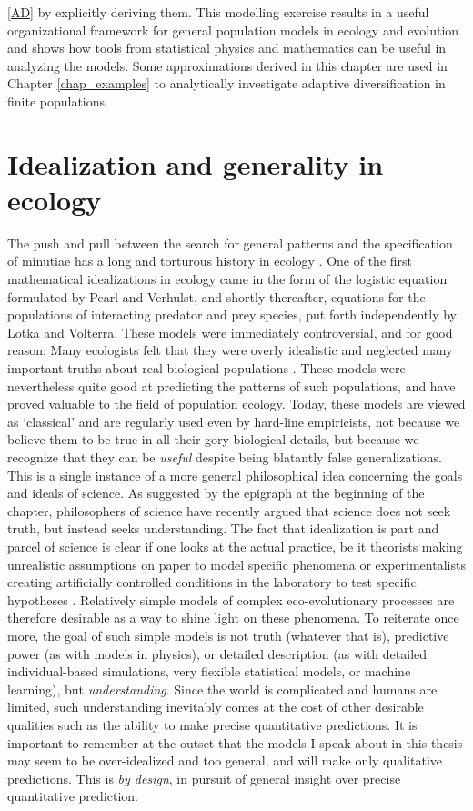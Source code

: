 \ref{AD} by explicitly deriving them. This modelling exercise results in a useful organizational framework for general population models in ecology and evolution and shows how tools from statistical physics and mathematics can be useful in analyzing the models. Some approximations derived in this chapter are used in Chapter \ref{chap_examples} to analytically investigate adaptive diversification in finite populations.

\section{Idealization and generality in ecology}\label{idealization}
The push and pull between the search for general patterns and the specification of minutiae has a long and torturous history in ecology \citep{kingsland_modeling_1985}. One of the first mathematical idealizations in ecology came in the form of the logistic equation formulated by Pearl and Verhulst, and shortly thereafter, equations for the populations of interacting predator and prey species, put forth independently by Lotka and Volterra. These models were immediately controversial, and for good reason: Many ecologists felt that they were overly idealistic and neglected many important truths about real biological populations \citep{kingsland_modeling_1985}. These models were nevertheless quite good at predicting the patterns of such populations, and have proved valuable to the field of population ecology. Today, these models are viewed as `classical' and are regularly used even by hard-line empiricists, not because we believe them to be true in all their gory biological details, but because we recognize that they can be \emph{useful} despite being blatantly false generalizations. This is a single instance of a more general philosophical idea concerning the goals and ideals of science. As suggested by the epigraph at the beginning of the chapter, philosophers of science \citep{potochnik_idealization_2018} have recently argued that science does not seek truth, but instead seeks understanding. The fact that idealization is part and parcel of science is clear if one looks at the actual practice, be it theorists making unrealistic assumptions on paper to model specific phenomena or experimentalists creating artificially controlled conditions in the laboratory to test specific hypotheses \citep{zuk_models_2018}. Relatively simple models of complex eco-evolutionary processes are therefore desirable as a way to shine light on these phenomena. To reiterate once more, the goal of such simple models is not truth (whatever that is), predictive power (as with models in physics), or detailed description (as with detailed individual-based simulations, very flexible statistical models, or machine learning), but \emph{understanding}. Since the world is complicated and humans are limited, such understanding inevitably comes at the cost of other desirable qualities such as the ability to make precise quantitative predictions. It is important to remember at the outset that the models I speak about in this thesis may seem to be over-idealized and too general, and will make only qualitative predictions. This is \textit{by design}, in pursuit of general insight over precise quantitative prediction.\\
